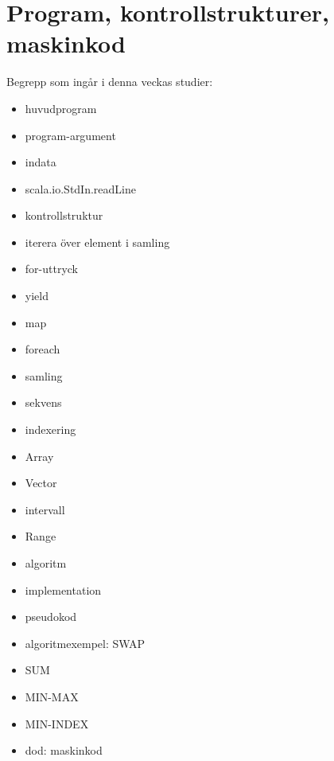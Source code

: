 \chapter{Program, kontrollstrukturer, maskinkod}\label{chapter:W02}
Begrepp som ingår i denna veckas studier:
\begin{itemize}[noitemsep,label={$\square$},leftmargin=*]
\item huvudprogram
\item program-argument
\item indata
\item scala.io.StdIn.readLine
\item kontrollstruktur
\item iterera över element i samling
\item for-uttryck
\item yield
\item map
\item foreach
\item samling
\item sekvens
\item indexering
\item Array
\item Vector
\item intervall
\item Range
\item algoritm
\item implementation
\item pseudokod
\item algoritmexempel: SWAP
\item SUM
\item MIN-MAX
\item MIN-INDEX
\item dod: maskinkod\end{itemize}
